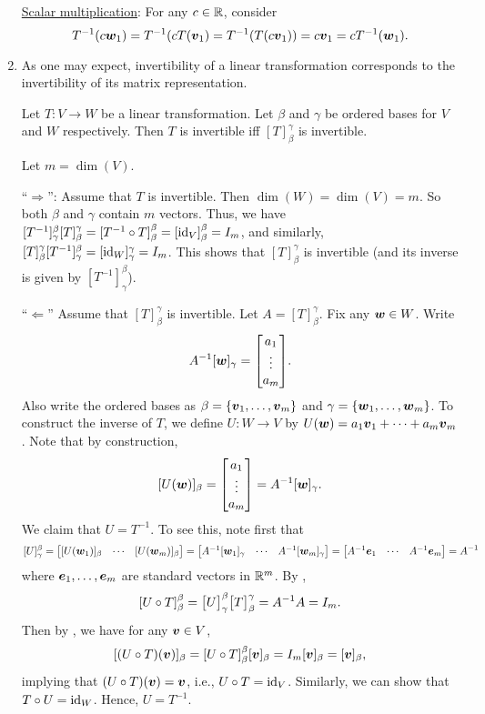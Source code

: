 \begin{enumerate}
\begin{pf}
\underline{Scalar multiplication}: For any \(c\in\mathbb{R}\), consider
\[
T^{-1}(c\vb*{w}_1)
=T^{-1}(cT(\vb*{v}_1)
=T^{-1}(T(c\vb*{v}_1))
=c\vb*{v}_1
=cT^{-1}(\vb*{w}_1).
\]
\end{pf}
\item As one may expect, invertibility of a linear transformation corresponds
to the invertibility of its matrix representation.

\begin{theorem}
\label{thm:lt-inv-matx-inv}
Let \(T:V\to W\) be a linear transformation. Let \(\beta\) and \(\gamma\) be
ordered bases for \(V\) and \(W\) respectively. Then \(T\) is invertible iff
\([T]_{\beta}^{\gamma}\) is invertible.
\end{theorem}
\begin{pf}
Let \(m=\dim(V)\).

``\(\Rightarrow\)'': Assume that \(T\) is invertible. Then
\(\dim(W)=\dim(V)=m\). So both \(\beta\) and \(\gamma\) contain \(m\) vectors.
Thus, we have \([T^{-1}]_{\gamma}^{\beta}[T]_{\beta}^{\gamma}=[T^{-1}\circ
T]_{\beta}^{\beta}=[\operatorname{id}_{V}]_{\beta}^{\beta}=I_m\), and similarly,
\([T]_{\beta}^{\gamma}[T^{-1}]_{\gamma}^{\beta}=[\operatorname{id}_{W}]_{\gamma}^{\gamma}=I_m\).
This shows that \([T]_{\beta}^{\gamma}\) is invertible (and its inverse is given
by \([T^{-1}]_{\gamma}^{\beta}\)).

``\(\Leftarrow\)'' Assume that \([T]_{\beta}^{\gamma}\) is invertible. Let
\(A=[T]_{\beta}^{\gamma}\). Fix any \(\vb*{w}\in W\). Write
\[
A^{-1}[\vect{w}]_{\gamma}=\mqty[a_1\\ \vdots\\ a_m].
\]
Also write the ordered bases as \(\beta=\{\vb*{v}_1,\dotsc,\vb*{v}_m\}\) and
\(\gamma=\{\vb*{w}_1,\dotsc,\vb*{w}_m\}\).  To construct the inverse of
\(T\), we define \(U:W\to V\) by
\(U(\vb*{w})=a_1\vb*{v}_1+\dotsb+a_m\vb*{v}_m\). Note that by construction,
\[
[U(\vect{w})]_{\beta}=\mqty[a_1\\ \vdots\\ a_m]=A^{-1}[\vect{w}]_{\gamma}.
\]
We claim that \(U=T^{-1}\). To see this, note first that
\[
[U]_{\gamma}^{\beta}
=\mqty[[U(\vect{w}_1)]_{\beta}&\cdots&[U(\vect{w}_m)]_{\beta}]
=\mqty[A^{-1}[\vect{w}_1]_{\gamma}&\cdots&A^{-1}[\vect{w}_m]_{\gamma}]
=\mqty[A^{-1}\vect{e}_1&\cdots&A^{-1}\vect{e}_m]
=A^{-1}
\]
where \(\vb*{e}_1,\dotsc,\vb*{e}_m\) are standard vectors in \(\mathbb{R}^m\). By
,
\[
[U\circ T]_{\beta}^{\beta}=\mqty[U]_{\gamma}^{\beta}\mqty[T]_{\beta}^{\gamma}
=A^{-1}A=I_m.
\]
Then by , we have for any \(\vb*{v}\in V\),
\[
[(U\circ T)(\vb*{v})]_{\beta}=[U\circ T]_{\beta}^{\beta}[\vb*{v}]_{\beta}
=I_m[\vb*{v}]_{\beta}
=[\vb*{v}]_{\beta},
\]
implying that \((U\circ T)(\vb*{v})=\vb*{v}\), i.e., \(U\circ T=\operatorname{id}_{V}\).
Similarly, we can show that \(T\circ U=\operatorname{id}_{W}\). Hence, \(U=T^{-1}\).
\end{pf}


\end{enumerate}
